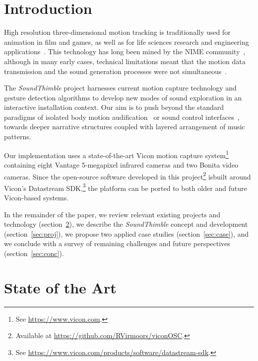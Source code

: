 \documentclass{nime-alternate}
\begin{document}
\section{Introduction}





High resolution three-dimensional motion tracking is traditionally used for animation in film and games, as well as for life sciences research and engineering applications~\cite{welch2002motion}. This technology has long been mined by the NIME community~\cite{dobrian2003gestural, nymoen2011soundsaber}, although in many early cases, technical limitations meant that the motion data transmission and the sound generation processes were not simultaneous~\cite{dobrian2003gestural, kapur2005framework}.


The \textit{SoundThimble} project harnesses current motion capture technology and gesture detection algorithms to develop new modes of sound exploration in an interactive installation context. Our aim is to push beyond the standard paradigms of isolated body motion audification~\cite{dobrian2003gestural,kapur2005framework} or sound control interfaces~\cite{eckel2009motion,nymoen2011soundsaber}, towards deeper narrative structures coupled with layered arrangement of music patterns.


Our implementation uses a state-of-the-art Vicon motion capture system\footnote{See  \url{https://www.vicon.com}.} containing eight Vantage 5-megapixel infrared cameras and two Bonita video cameras. Since the open-source software developed in this project\footnote{Available at  \url{https://github.com/RVirmoors/viconOSC}.} is\linebreak built around Vicon's Datastream SDK,\footnote{See  \url{https://www.vicon.com/products/software/datastream-sdk}.} the platform can be ported to both older and future Vicon-based systems.

In the remainder of the paper, we review relevant existing projects and technology (section~\ref{sec:related}), we describe the \textit{SoundThimble} concept and development (section~\ref{sec:proj}), we propose two applied case studies (section~\ref{sec:case}), and we conclude with a survey of remaining challenges and future perspectives (section~\ref{sec:conc}).


\section{State of the Art}
\label{sec:related}
\end{document}

